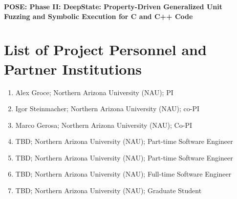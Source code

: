 \documentclass[12pt]{article}
\begin{document}
\begin{center}
{\Large\sf\textbf{POSE: Phase II: DeepState: Property-Driven Generalized Unit Fuzzing and Symbolic Execution for C and C++ Code}}
\end{center}

\section*{List of Project Personnel and Partner Institutions}

\begin{enumerate}
  \item Alex Groce;  Northern Arizona University (NAU); PI
  \item Igor Steinmacher; Northern Arizona University (NAU); co-PI
  \item Marco Gerosa; Northern Arizona University (NAU); Co-PI
  \item TBD; Northern Arizona University (NAU); Part-time Software Engineer
  \item TBD; Northern Arizona University (NAU); Part-time Software Engineer
  \item TBD; Northern Arizona University (NAU); Full-time Software Engineer
  \item TBD; Northern Arizona University (NAU); Graduate Student
\end{enumerate}
\end{document}
